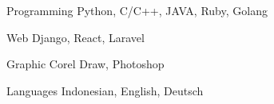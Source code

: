 \begin{cvskills}

  \cvskill
    {Programming} %
    {Python, C/C++, JAVA, Ruby, Golang} %

  \cvskill
    {Web} %
    {Django, React, Laravel} %

  \cvskill
    {Graphic} %
    {Corel Draw, Photoshop} %

  \cvskill
    {Languages} %
    {Indonesian, English, Deutsch} %

\end{cvskills}
